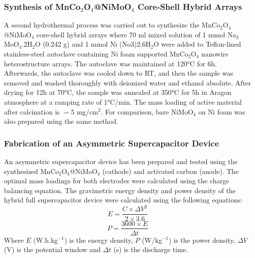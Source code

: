 \documentclass[reprint,amsmath,amssymb,aps,floatfix,
]{revtex4-2}
\begin{document}
\subsubsection{Synthesis of MnCo$_2$O$_4$@NiMoO$_4$ Core-Shell Hybrid Arrays}
A second hydrothermal process was carried out to synthesize the MnCo$_2$O$_4$@NiMoO$_4$ core-shell hybrid arrays where 70 ml mixed solution of 1 mmol Na$_2$MoO$_4$.2H$_2$O (0.242 g) and 1 mmol Ni (No3)2.6H$_2$O were added to Teflon-lined stainless-steel autoclave containing Ni foam supported MnCo$_2$O$_4$ nanowire heterostructure arrays. The autoclave was maintained at \ang{120}C for 6h. Afterwards, the autoclave was cooled down to RT, and then the sample was removed and washed thoroughly with deionized water and ethanol absolute. After drying for 12h at \ang{70}C, the sample was annealed at \ang{350}C for 5h in Aragon atmosphere at a ramping rate of \ang{1}C/min. The mass loading of active material after calcination is $\backsim$5 mg/cm$^2$. For comparison, bare NiMoO$_4$ on Ni foam was also prepared using the same method.
\subsubsection{Fabrication of an Asymmetric Supercapacitor Device}
An asymmetric supercapacitor device has been prepared and tested using the synthesized MnCo$_2$O$_4$@NiMoO$_4$ (cathode) and activated carbon (anode).  The optimal mass loadings for both electrodes were calculated using the charge balancing equation. The gravimetric energy density and power density of the hybrid full supercapacitor device were calculated using the following equations:
\begin{equation}
    E = \frac{C \times \Delta V^2}{2 \times 3.6} 
\end{equation}
\begin{equation}
    P = \frac{3600 \times E}{\Delta t} 
\end{equation}
Where $E$ (W.h.kg$^{-1}$) is the energy density, $P$ (W/kg$^{-1}$) is the power density, $\Delta V$ (V) is the potential window and $\Delta t$ (s) is the discharge time.
\end{document}
